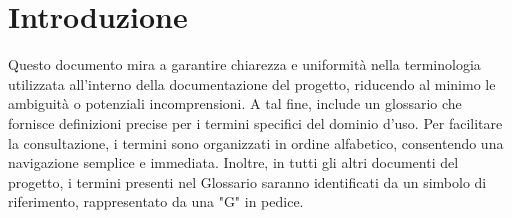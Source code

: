 \section{Introduzione}
Questo documento mira a garantire chiarezza e uniformità nella terminologia utilizzata all'interno della documentazione del progetto, riducendo al minimo le ambiguità o potenziali incomprensioni. A tal fine, include un glossario che fornisce definizioni precise per i termini specifici del dominio d'uso.
Per facilitare la consultazione, i termini sono organizzati in ordine alfabetico, consentendo una navigazione semplice e immediata. Inoltre, in tutti gli altri documenti del progetto, i termini presenti nel Glossario saranno identificati da un simbolo di riferimento, rappresentato da una "G" in pedice.